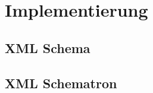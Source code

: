 \chapter{Implementierung}
\label{cha:Implementierung}

\section{XML Schema}

\section{XML Schematron}